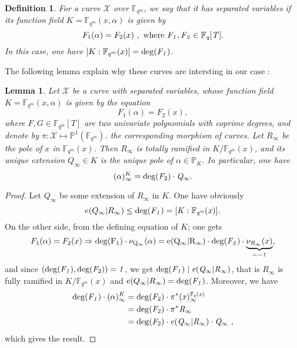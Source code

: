 \documentclass[10pt]{article}
\newtheorem{def1}{Definition}[]
\newtheorem{lem1}{Lemma}[]
\newcommand{\s}{\vspace{0.3cm}}
\newcommand{\cd}{\cdot}
\newcommand{\fqm}{\mathbb{F}_{q^m}}
\newcommand{\fq}{\mathbb{F}_q}
\newcommand{\X}{\mathcal{X}}
\begin{document}
\s

\begin{def1} \label{courbes à variables séparées}
For a curve $\X$ over $\fqm$, we say that it has separated variables if its function field $K=\fqm(x,\alpha)$ is given by
\[F_1(\alpha) = F_2(x) \ , \ \rm where \ \it  F_1,F_2 \in \fq[T].\]
In this case, one have $[K:\fqm(x)] = \rm{deg}(\it{F_1})$.
\end{def1}

\s

The following lemma explain why these curves are intersting in our case :

\s

\begin{lem1} \label{lemdegré}
Let $\X$ be a curve with separated variables, whose function field $K=\fqm(x,\alpha)$ is given by the equation
\[F_1(\alpha) = F_2(x),\]
where $F,G \in \fqm[T]$ are two univariate polynomials with coprime degrees, and denote by $\pi : \X \longmapsto \mathbb{P}^1(\fqm)$. the corresponding morphism of curves. Let $R_{\infty}$ be the pole of $x$ in $\fqm(x)$. Then $R_{\infty}$ is totally ramified in $K/\fqm(x)$, and its unique extension $Q_{\infty} \in K$ is the unique pole of $\alpha \in \mathbb{P}_K$. In particular, one have 
\[(\alpha)^K_{\infty} = \rm{deg}\it{(F_{\rm 2}) \cd Q_{\infty}}.\]
\end{lem1}

\s

\begin{proof}
Let $Q_{\infty}$ be some extension of $R_{\infty}$ in $K$. One have obviously
\[e(Q_{\infty}|R_{\infty}) \leq \rm{deg}\it(F_1)=[K:\fqm(x)].\]
On the other side, from the defining equation of $K$; one gets
\[F_1(\alpha) = F_2(x) \Rightarrow \rm{deg}(F_1) \cd \nu_{Q_{\infty}}(\alpha) = e(Q_{\infty}|R_{\infty}) \cd \rm{deg}\it(F_2) \cd \underbrace{\nu_{R_{\infty}}(x)}_{=-1},\]
and since $(\rm{deg}\it(F_1),\rm{deg}(\it F_{\rm 2}))=1$, we get $\rm{deg}\it(F_1) \mid e(Q_{\infty}|R_{\infty})$, that is $R_{\infty}$ is fully ramified in $K/\fqm(x)$ and $e(Q_{\infty}|R_{\infty})=\rm{deg}\it(F_1)$. Moreover, we have 
\begin{align*}
\rm{deg}\it(F_1) \cd (\alpha)^K_{\infty} &= \rm{deg}\it(F_{\rm 2}) \cd \pi^*(x)^{\fq(x)}_{\infty} \\
&= \rm{deg}\it(F_{\rm 2}) \cd \pi^* R_{\infty} \\
&= \rm{deg}\it(F_{\rm 2}) \cd e(Q_{\infty}|R_{\infty}) \cd Q_{\infty} \ ,
\end{align*}
which gives the result.
\end{proof}
\end{document}
